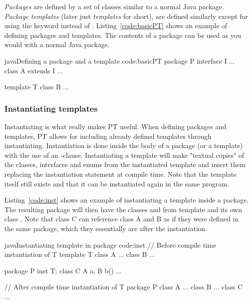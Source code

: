 \emph{Packages} are defined by a set of classes similar to a normal Java package.
\emph{Package templates} (later just \emph{templates} for short), are defined similarly except for using the keyword  instead of .
Listing~\vref{code:basicPT} shows an example of defining packages and templates.
The contents of a package can be used as you would with a normal Java package.

\begin{code}{java}{Defining a package  and a template }{code:basicPT}
    package P {
        interface I { ... }
        class A extends I { ... }
    }

    template T {
        class B { ... }
    }
\end{code}

\subsubsection{Instantiating templates}\label{subsubsec:inst}
Instantiating is what really makes PT useful.
When defining packages and templates, PT allows for including already defined templates through instantiating.
Instantiation is done inside the body of a package (or a template) with the use of an -clause.
Instantiating a template will make "textual copies" of the  classes, interfaces and enums from the instantiated template and insert them replacing the instantiation statement at compile time.
Note that the template itself still exists and that it can be instantiated again in the same program.

Listing~\vref{code:inst} shows an example of instantiating a template inside a package.
The resulting package  will then have the classes  and  from template  and its own class .
Note that class C can reference class A and B as if they were defined in the same package, which they essentially are after the instantiation.

\begin{code}{java}{Instantiating template  in package }{code:inst}
// Before compile time instantiation of T
template T {
    class A { ... }
    class B { ... }
}

package P {
    inst T;
    class C {
        A a;
        B b() {
            ...
        }
    }
}

// After compile time instantiation of T
package P {
    class A { ... }
    class B { ... }
    class C { ... }
}
\end{code}

